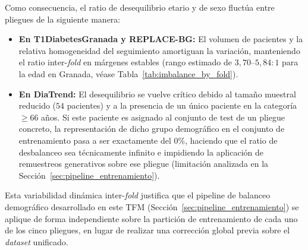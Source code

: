 Como consecuencia, el ratio de desequilibrio etario y de sexo fluctúa entre pliegues
de la siguiente manera:

\begin{itemize}
    \item \textbf{En T1DiabetesGranada y REPLACE-BG:} El volumen de pacientes y la
    relativa homogeneidad del seguimiento amortiguan la variación, manteniendo el ratio
    inter-\textit{fold} en márgenes estables (rango estimado de
    $3{,}70\text{--}5{,}84:1$ para la edad en Granada,
    véase Tabla~\ref{tab:imbalance_by_fold}).

    \item \textbf{En DiaTrend:} El desequilibrio se vuelve crítico debido al tamaño
    muestral reducido ($54$ pacientes) y a la presencia de un único paciente en la
    categoría $\geq 66$ años. Si este paciente es asignado al conjunto de test de un
    pliegue concreto, la representación de dicho grupo demográfico en el conjunto de
    entrenamiento pasa a ser exactamente del $0\%$, haciendo que el ratio de
    desbalanceo sea técnicamente infinito e impidiendo la aplicación de remuestreos
    generativos sobre ese pliegue (limitación analizada en la
    Sección~\ref{sec:pipeline_entrenamiento}).
\end{itemize}

Esta variabilidad dinámica inter-\textit{fold} justifica que el pipeline de balanceo
demográfico desarrollado en este TFM (Sección~\ref{sec:pipeline_entrenamiento}) se
aplique de forma independiente sobre la partición de entrenamiento de cada uno de los
cinco pliegues, en lugar de realizar una corrección global previa sobre el
\textit{dataset} unificado.

